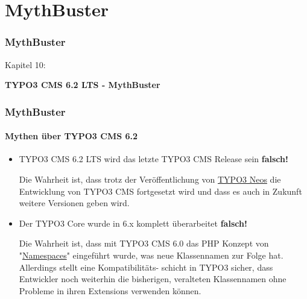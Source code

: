 %

\section{MythBuster}
\begin{frame}[fragile]
	\frametitle{MythBuster}

	\begin{center}\huge{Kapitel 10:}\end{center}
	\begin{center}\huge{\color{typo3darkgrey}\textbf{TYPO3 CMS 6.2 LTS - MythBuster}}\end{center}

\end{frame}


\begin{frame}[fragile]
	\frametitle{MythBuster}
	\framesubtitle{Mythen über TYPO3 CMS 6.2}

	\begin{itemize}
		\item TYPO3 CMS 6.2 LTS wird das letzte TYPO3 CMS Release sein
			\tabto{9cm}\color{red}\textbf{\textrightarrow falsch!}\color{black}

			\smaller
				Die Wahrheit ist, dass trotz der Veröffentlichung von \href{http://neos.typo3.org}{TYPO3 Neos} die Entwicklung von TYPO3 CMS fortgesetzt wird und dass es auch in Zukunft weitere Versionen geben wird.
			\normalsize
			\newline

		\item Der TYPO3 Core wurde in 6.x komplett überarbeitet
			\tabto{9cm}\color{red}\textbf{\textrightarrow falsch!}\color{black}

			\smaller
				Die Wahrheit ist, dass mit TYPO3 CMS 6.0 das PHP Konzept von "\href{http://php.net/namespaces}{Namespaces}" eingeführt wurde, was neue Klassennamen zur Folge hat. Allerdings stellt eine Kompatibilitäts- schicht in TYPO3 sicher, dass Entwickler noch weiterhin die bisherigen, veralteten Klassennamen ohne Probleme in ihren Extensions verwenden können.
			\normalsize

	\end{itemize}

\end{frame}

